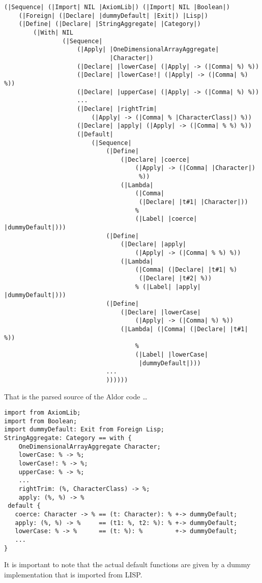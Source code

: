 \documentclass{article}
\begin{document}
\begin{verbatim}
(|Sequence| (|Import| NIL |AxiomLib|) (|Import| NIL |Boolean|)
    (|Foreign| (|Declare| |dummyDefault| |Exit|) |Lisp|)
    (|Define| (|Declare| |StringAggregate| |Category|)
        (|With| NIL
                (|Sequence|
                    (|Apply| |OneDimensionalArrayAggregate|
                             |Character|)
                    (|Declare| |lowerCase| (|Apply| -> (|Comma| %) %))
                    (|Declare| |lowerCase!| (|Apply| -> (|Comma| %) %))
                    (|Declare| |upperCase| (|Apply| -> (|Comma| %) %))
                    ...
                    (|Declare| |rightTrim|
                        (|Apply| -> (|Comma| % |CharacterClass|) %))
                    (|Declare| |apply| (|Apply| -> (|Comma| % %) %))
                    (|Default|
                        (|Sequence|
                            (|Define|
                                (|Declare| |coerce|
                                    (|Apply| -> (|Comma| |Character|)
                                     %))
                                (|Lambda|
                                    (|Comma|
                                     (|Declare| |t#1| |Character|))
                                    %
                                    (|Label| |coerce| |dummyDefault|)))
                            (|Define|
                                (|Declare| |apply|
                                    (|Apply| -> (|Comma| % %) %))
                                (|Lambda|
                                    (|Comma| (|Declare| |t#1| %)
                                     (|Declare| |t#2| %))
                                    % (|Label| |apply| |dummyDefault|)))
                            (|Define|
                                (|Declare| |lowerCase|
                                    (|Apply| -> (|Comma| %) %))
                                (|Lambda| (|Comma| (|Declare| |t#1| %))
                                    %
                                    (|Label| |lowerCase|
                                     |dummyDefault|)))
                            ...
                            ))))))
\end{verbatim}
That is the parsed source of the Aldor code \ldots
\begin{verbatim}
import from AxiomLib;
import from Boolean;
import dummyDefault: Exit from Foreign Lisp;
StringAggregate: Category == with {
    OneDimensionalArrayAggregate Character;
    lowerCase: % -> %;
    lowerCase!: % -> %;
    upperCase: % -> %;
    ...
    rightTrim: (%, CharacterClass) -> %;
    apply: (%, %) -> %
 default {
   coerce: Character -> % == (t: Character): % +-> dummyDefault;
   apply: (%, %) -> %     == (t1: %, t2: %): % +-> dummyDefault;
   lowerCase: % -> %      == (t: %): %         +-> dummyDefault;
   ...
}
\end{verbatim}
It is important to note that the actual default functions are given by
a dummy implementation that is imported from LISP.
\end{document}
